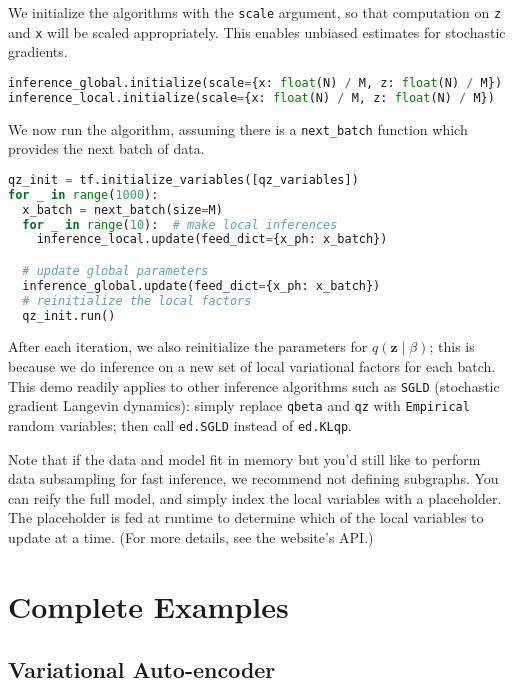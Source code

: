 We initialize the algorithms with the \texttt{scale} argument, so that
computation on \texttt{z} and \texttt{x} will be scaled appropriately.
This enables unbiased estimates for stochastic gradients.
\begin{lstlisting}[language=Python]
inference_global.initialize(scale={x: float(N) / M, z: float(N) / M})
inference_local.initialize(scale={x: float(N) / M, z: float(N) / M})
\end{lstlisting}
We now run the algorithm, assuming there is a \texttt{next_batch}
function which provides the next batch of data.
\begin{lstlisting}[language=Python]
qz_init = tf.initialize_variables([qz_variables])
for _ in range(1000):
  x_batch = next_batch(size=M)
  for _ in range(10):  # make local inferences
    inference_local.update(feed_dict={x_ph: x_batch})

  # update global parameters
  inference_global.update(feed_dict={x_ph: x_batch})
  # reinitialize the local factors
  qz_init.run()
\end{lstlisting}
After each iteration, we also reinitialize the parameters for
$q(\mathbf{z}\mid\beta)$; this is because we do inference on a new
set of local variational factors for each batch.
This demo readily applies to other inference algorithms such as
\texttt{SGLD} (stochastic gradient Langevin dynamics): simply
replace \texttt{qbeta} and \texttt{qz} with \texttt{Empirical} random
variables; then call \texttt{ed.SGLD} instead of \texttt{ed.KLqp}.

Note that if the data and model fit in memory but you'd still like to
perform data subsampling for fast inference, we recommend not defining
subgraphs. You can reify the full model, and simply index the local
variables with a placeholder. The placeholder is fed at runtime to
determine which of the local variables to update at a time. (For more
details, see the website's API.)







\section{Complete Examples}
\label{appendix:complete}

\subsection{Variational Auto-encoder}
\label{appendix:vae}

